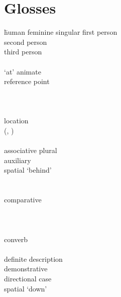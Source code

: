 
\section*{Glosses}
	\begin{multicols}{2}
    \largerpage[2]
		\begin{tabbing}
            \hspace{\tabcolsep}\= human feminine singular\kill
				\>	first person\\
				\>	second person\\
				\>	third person\\
				\>	\\
			 \>	 `at' animate \\
			{}		\> reference point\\
				\>	\\
				\>	\\
				\>	\\
				\>	location \\
			{}		\>	(, )\\
				\>	\\
				\>	associative plural\\
				\>	auxiliary\\
				\>	spatial  `behind'\\
				\>	\\
				\>	\\
				\>	comparative\\
				\>	\\
				\>	\\
				\>	\\
				\>	converb\\
				\>	\\
				\>	definite description\\
				\>	demonstrative\\
				\>	directional case\\
				\>	spatial  `down'\\

\end{tabbing}
\end{multicols}
